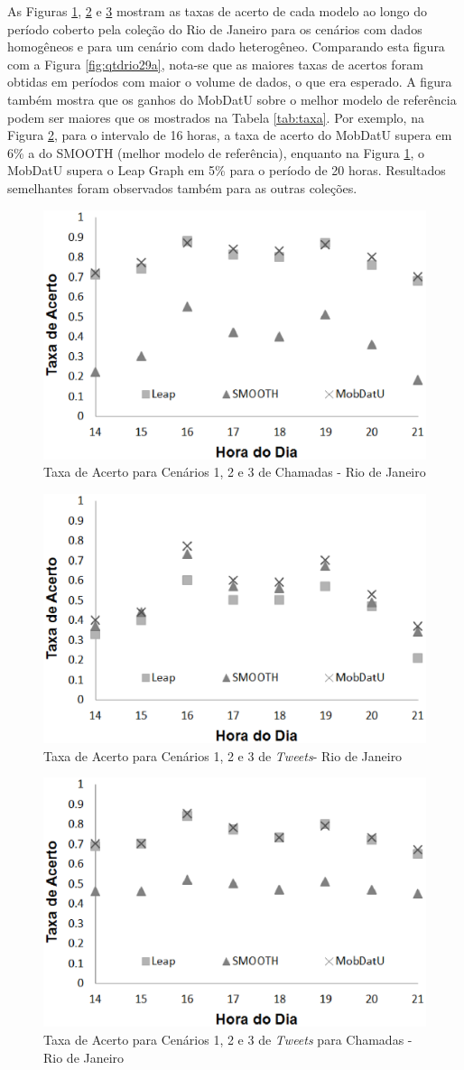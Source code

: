 \documentclass[10pt, a4paper, onecolumn, conference, compsocconf]{IEEEtran}
\begin{document}
As Figuras \ref{fig:taxadeacertorioa}, \ref{fig:taxadeacertoriob} e \ref{fig:taxadeacertorioc} mostram as taxas de acerto de cada modelo ao longo do período coberto pela coleção do Rio de Janeiro para os cenários com dados homogêneos e para um cenário com dado heterogêneo. Comparando esta figura com a Figura \ref{fig:qtdrio29a}, nota-se que as maiores taxas de acertos foram obtidas em períodos com maior o volume de dados, o que era esperado. A figura também mostra que os ganhos do MobDatU sobre o melhor modelo de referência podem ser maiores que os mostrados na Tabela \ref{tab:taxa}.  Por exemplo, na Figura \ref{fig:taxadeacertoriob}, para o intervalo de 16 horas, a taxa de acerto do MobDatU supera em 6\% a do SMOOTH (melhor modelo de referência), enquanto na Figura \ref{fig:taxadeacertorioa}, o MobDatU supera o Leap Graph em 5\% para o período de 20 horas. 
Resultados semelhantes foram observados também para as outras coleções.

\begin{figure}[!ttt]
\centering
\includegraphics[width=0.5\linewidth]{Graficos/txchamadasRiohora.eps}
\caption{Taxa de Acerto para Cenários 1, 2 e 3 de Chamadas - Rio de Janeiro}
\label{fig:taxadeacertorioa}
\end{figure}

\begin{figure}[!ttt]
\centering
\includegraphics[width=0.5\linewidth]{Graficos/txtweetRiohora.eps}
\caption{Taxa de Acerto para Cenários 1, 2 e 3 de \textit{Tweets}- Rio de Janeiro}
\label{fig:taxadeacertoriob}
\end{figure}

\begin{figure}[!ttt]
\centering
\includegraphics[width=0.5\linewidth]{Graficos/txtwittercchamadaRiohora.eps}
\caption{Taxa de Acerto para Cenários 1, 2 e 3 de \textit{Tweets} para Chamadas - Rio de Janeiro}
\label{fig:taxadeacertorioc}
\end{figure}
\end{document}
